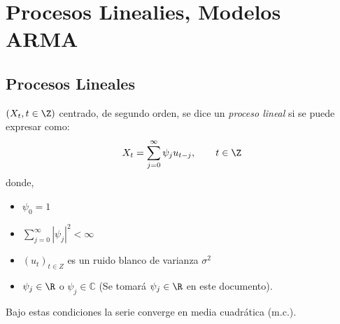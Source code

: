 \chapter{Procesos Linealies, Modelos ARMA}

\section{Procesos Lineales}

\begin{definicion}
$\left({X_{t}, t\in \Z} \right)$ centrado, de segundo orden, se dice un \emph{proceso lineal} si se puede expresar como:
\begin{equation}
\label{eq1}
X_{t} =\sum_{j=0}^\infty {\psi_{j} u_{t-j}}, \qquad t\in \Z
\end{equation}
donde,
\begin{itemize}
 \item $\psi_{0}=1$
 \item $\displaystyle\sum\limits_{j=0}^\infty \left| \psi_{j} \right|^{2} <\infty $
 \item $\left( u_{t} \right)_{t\in Z}$ es un ruido blanco de varianza $\sigma^{2}$
 \item $\psi_{j} \in \R$ o $\psi_{j} \in \mathbb{C}$ (Se tomar\'{a} $\psi_{j} \in \R$ en este documento). 
\end{itemize}
\end{definicion}

Bajo estas condiciones la serie converge en media cuadr\'{a}tica (m.c.).

